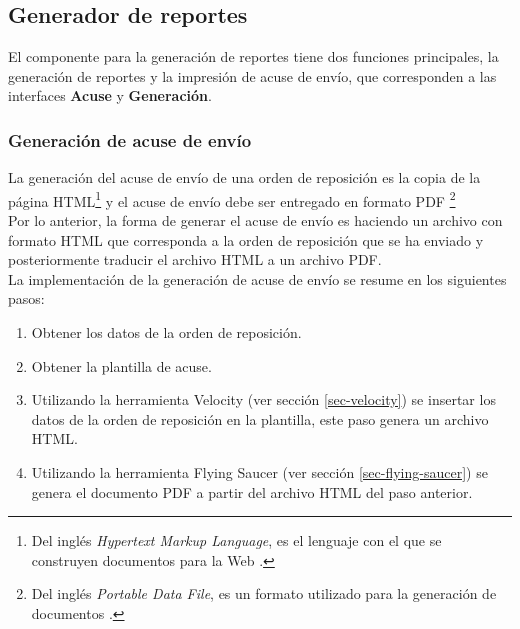 \subsection{Generador de reportes}
El componente para la generación de reportes tiene dos funciones principales, la generación de reportes y la impresión de acuse de envío, que corresponden a las interfaces \textbf{Acuse} y \textbf{Generación}.

\subsubsection{Generación de acuse de envío}
La generación del acuse de envío de una orden de reposición es la copia de la página HTML\footnote{Del inglés \textit{Hypertext Markup Language}, es el lenguaje con el que se construyen documentos para la Web \cite{HTMLCSSCompleteReference}.} y el acuse de envío debe ser entregado en formato PDF \footnote{Del inglés \textit{Portable Data File}, es un formato utilizado para la generación de documentos \cite{iTextInAction}.}\\
Por lo anterior, la forma de generar el acuse de envío es haciendo un archivo con formato HTML que corresponda a la orden de reposición que se ha enviado y posteriormente traducir el archivo HTML a un archivo PDF.\\
La implementación de la generación de acuse de envío se resume en los siguientes pasos:
\begin{enumerate}
	\item Obtener los datos de la orden de reposición.
	\item Obtener la plantilla de acuse.
	\item Utilizando la herramienta Velocity (ver sección \ref{sec-velocity}) se insertar los datos de la orden de reposición en la plantilla, este paso genera un archivo HTML.
	\item Utilizando la herramienta Flying Saucer (ver sección \ref{sec-flying-saucer}) se genera el documento PDF a partir del archivo HTML del paso anterior.
\end{enumerate}

